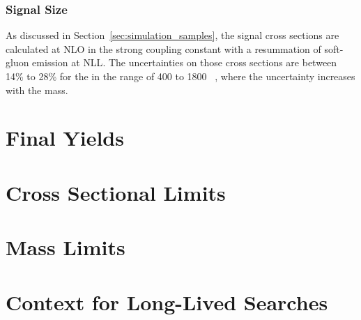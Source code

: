 \subsubsection{Signal Size}
As discussed in Section~\ref{sec:simulation_samples}, the signal cross sections are calculated at \ac{NLO} in the strong coupling constant with a resummation of soft-gluon emission at \ac{NLL}. 
The uncertainties on those cross sections are between 14\% to 28\% for the \rhadrons in the range of 400 to 1800 \GeV~\cite{Mackeprang:2006gx, Mackeprang:2009ad}, where the uncertainty increases with the mass.



\section{Final Yields}


\section{Cross Sectional Limits}


\section{Mass Limits}


\section{Context for Long-Lived Searches}

